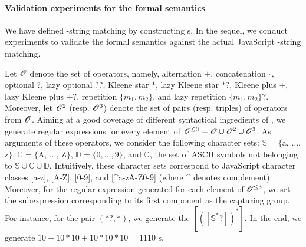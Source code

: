 \paragraph{Validation experiments for the formal semantics} \label{sect：valid}
We have defined %
{\regexp}-string matching by constructing {\PSST}s. %
In the sequel, we conduct experiments to validate the formal semantics against the actual JavaScript {\regexp}-string matching.

Let $\mathscr{O}$ denote the set of {\regexp} operators, namely, alternation $+$, concatenation $\cdot$, optional $?$, lazy optional $??$, Kleene star $*$, lazy Kleene star $*?$, Kleene plus $+$, lazy Kleene plus $+?$, repetition $\{m_1,m_2\}$, and lazy repetition $\{m_1,m_2\}?$. Moreover, let $\mathscr{O}^{2}$ (resp. $\mathscr{O}^{3}$) denote the set of pairs (resp. triples) of operators from $\mathscr{O}$. 
Aiming at a good coverage of different syntactical ingredients of {\regexp}, we generate regular expressions for every element of $\mathscr{O}^{\le 3} = \mathscr{O} \cup \mathscr{O}^2 \cup \mathscr{O}^3$.
As arguments of these operators, we consider the following character sets: $\mathbb{S} = \{$a, $\ldots$, z$\}$, $\mathbb{C}=\{$A, $\ldots$, Z$\}$, $\mathbb{D} = \{0,\ldots,9\}$, and $\mathbb{O}$, the set of ASCII symbols not belonging to $\mathbb{S} \cup \mathbb{C} \cup \mathbb{D}$.
Intuitively, these character sets correspond to JavaScript character classes [a-z], [A-Z], [0-9], and [{\textasciicircum}a-zA-Z0-9] (where {\textasciicircum} denotes complement).
Moreover, for the regular expression generated for each element of $\mathscr{O}^{\le 3}$, we set the subexpression corresponding to its first component as the capturing group. 
For instance, for the pair $(*?, *)$, we generate the {\regexp} $[([\mathbb{S}^*?])^{*}]$. In the end, we generate $10+10*10+10*10*10 = 1110$ {\regexp}s. 

